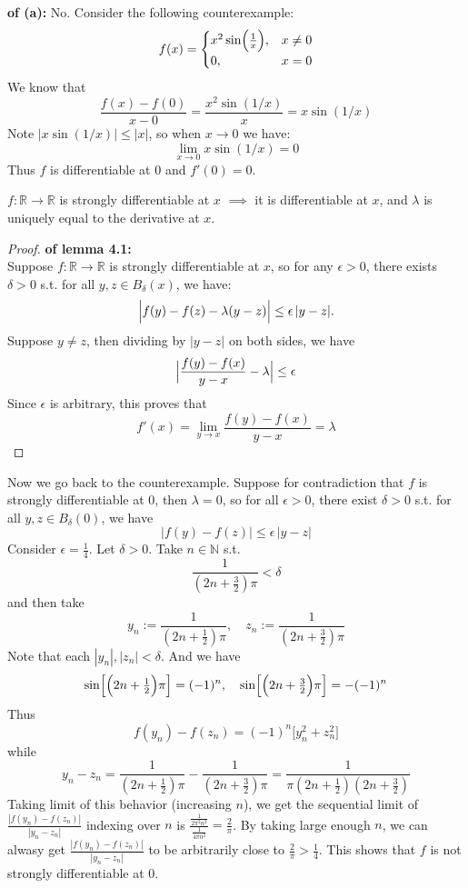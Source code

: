 \documentclass[lang=cn,11pt]{elegantbook}
\begin{document}
\begin{solution}
    \textbf{of (a):} No. Consider the following counterexample: \\
\[
f(x)=
\begin{cases}
x^2\sin\Bigl(\frac{1}{x}\Bigr), & x\neq 0\\
0, & x=0
\end{cases}
\]
We know that
\[
\frac{f(x)-f(0)}{x-0} = \frac{x^2\sin(1/x)}{x} = x\sin(1/x)
\]
Note \(|x\sin(1/x)|\le |x|\), so when \( x\to 0 \) we have:
\[
\lim_{x\to 0} x\sin(1/x) = 0
\]
Thus $f$ is differentiable at $0$ and \( f'(0)=0 \).

\begin{lemma}
 $f:\mathbb{R} \rightarrow \mathbb{ R}$ is strongly differentiable at $x$ $\implies$ it is differentiable at $x$, and $\lambda$ is uniquely equal to the derivative at $x$.
\end{lemma}
\begin{proof}
    \textbf{of lemma 4.1:}\\
   Suppose $f:\mathbb{R} \rightarrow \mathbb{ R}$ is strongly differentiable at $x$, so for any \(\epsilon>0\), there exists \(\delta>0\) s.t. for all $y,z\in B_\delta (x)$, we have: \[
\Bigl|f(y)-f(z)-\lambda(y-z)\Bigr|\le \epsilon\,|y-z|.
\]
Suppose $y\not = z$, then dividing by \(|y-z|\) on both sides, we have
\[
\Bigl|\frac{f(y)-f(x)}{y-x}-\lambda\Bigr|\le \epsilon
\]
Since $\epsilon$ is arbitrary, this proves that 
\[
f'(x) = \lim_{y\to x}\frac{f(y)-f(x)}{y-x}=\lambda  
\]
\end{proof}

Now we go back to the counterexample. Suppose for contradiction that $f$ is strongly differentiable at $0$, then $\lambda = 0$, so for all \(\epsilon>0\), there exist \(\delta>0\) s.t. for all $y,z \in B_\delta(0)$, we have
\[
|f(y)-f(z)| \le \epsilon\,|y-z|
\]
Consider \(\epsilon=\tfrac{1}{4}\). Let $\delta > 0$. Take $n\in\mathbb{N}$ s.t.
\[
\frac{1}{(2n+\tfrac{3}{2})\pi} < \delta
\]and then take
\[
y_n:= \frac{1}{\left(2n+\tfrac{1}{2}\right)\pi},\quad
z_n:= \frac{1}{\left(2n+\tfrac{3}{2}\right)\pi}
\]Note that each $|y_n|,|z_n| < \delta$. And we have \[
   \sin\Bigl[\Bigl(2n+\tfrac{1}{2}\Bigr)\pi\Bigr]=(-1)^n,\quad
   \sin\Bigl[\Bigl(2n+\tfrac{3}{2}\Bigr)\pi\Bigr]= -(-1)^n
   \]Thus \[
   f(y_n)-f(z_n)= (-1)^n\bigl[y_n^2+z_n^2\bigr]
   \]while 
\[
y_n-z_n = \frac{1}{\left(2n+\tfrac{1}{2}\right)\pi} - \frac{1}{\left(2n+\tfrac{3}{2}\right)\pi}
=\frac{1}{\pi\left(2n+\tfrac{1}{2}\right)\left(2n+\tfrac{3}{2}\right)}
\]
Taking limit of this behavior (increasing $n$), we get the sequential limit of \(\frac{|f(y_n)-f(z_n)|}{|y_n-z_n|} \) indexing over $n$ is $\frac{\frac{1}{2\pi^2 n^2}}{\frac{1}{4\pi n^2}} = \frac{2}{\pi}$.
By taking large enough $n$, we can alwasy get \(\frac{|f(y_n)-f(z_n)|}{|y_n-z_n|} \) to be arbitrarily close to \( \frac{2}{\pi}> \frac{1}{4}\).
This shows that $f$ is not strongly differentiable at $0$.
\end{solution}
\end{document}
